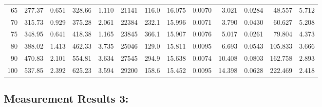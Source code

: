 \documentclass[10pt]{article}
\begin{document}
{\begin{tabular}{|r|rr|rr|rr|rr|rr|r|r|}
       65 &       277.37 &        0.651 &       328.66 &        1.110 &        21141 &        116.0 &       16.075 &       0.0070 &        3.021 &       0.0284 &       48.557 &        5.712 \\
       70 &       315.73 &        0.929 &       375.28 &        2.061 &        22384 &        232.1 &       15.996 &       0.0071 &        3.790 &       0.0430 &       60.627 &        5.208 \\
       75 &       348.95 &        0.641 &       418.38 &        1.165 &        23845 &        366.1 &       15.907 &       0.0076 &        5.017 &       0.0261 &       79.804 &        4.373 \\
       80 &       388.02 &        1.413 &       462.33 &        3.735 &        25046 &        129.0 &       15.811 &       0.0095 &        6.693 &       0.0543 &      105.833 &        3.666 \\
       90 &       470.83 &        2.101 &       554.81 &        3.634 &        27545 &        294.9 &       15.638 &       0.0074 &       10.408 &       0.0803 &      162.758 &        2.893 \\
      100 &       537.85 &        2.392 &       625.23 &        3.594 &        29200 &        158.6 &       15.452 &       0.0095 &       14.398 &       0.0628 &      222.469 &        2.418 \\
\hline
\end{tabular}
}



\subsection*{\large \bf Measurement Results 3:}
\end{document}
